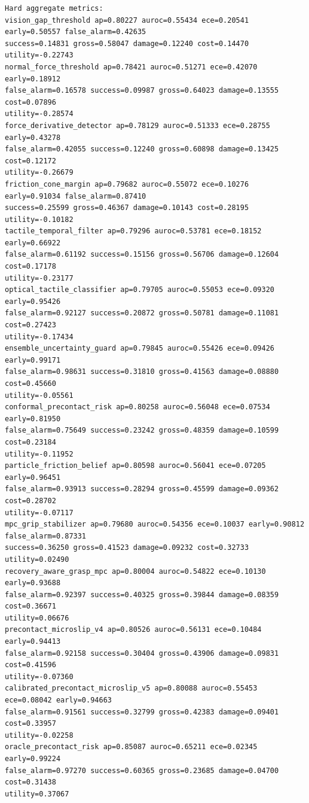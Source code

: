 \documentclass{article}
\begin{document}
\begin{tiny}
\begin{verbatim}
Hard aggregate metrics:
vision_gap_threshold ap=0.80227 auroc=0.55434 ece=0.20541 early=0.50557 false_alarm=0.42635
success=0.14831 gross=0.58047 damage=0.12240 cost=0.14470 utility=-0.22743
normal_force_threshold ap=0.78421 auroc=0.51271 ece=0.42070 early=0.18912
false_alarm=0.16578 success=0.09987 gross=0.64023 damage=0.13555 cost=0.07896
utility=-0.28574
force_derivative_detector ap=0.78129 auroc=0.51333 ece=0.28755 early=0.43278
false_alarm=0.42055 success=0.12240 gross=0.60898 damage=0.13425 cost=0.12172
utility=-0.26679
friction_cone_margin ap=0.79682 auroc=0.55072 ece=0.10276 early=0.91034 false_alarm=0.87410
success=0.25599 gross=0.46367 damage=0.10143 cost=0.28195 utility=-0.10182
tactile_temporal_filter ap=0.79296 auroc=0.53781 ece=0.18152 early=0.66922
false_alarm=0.61192 success=0.15156 gross=0.56706 damage=0.12604 cost=0.17178
utility=-0.23177
optical_tactile_classifier ap=0.79705 auroc=0.55053 ece=0.09320 early=0.95426
false_alarm=0.92127 success=0.20872 gross=0.50781 damage=0.11081 cost=0.27423
utility=-0.17434
ensemble_uncertainty_guard ap=0.79845 auroc=0.55426 ece=0.09426 early=0.99171
false_alarm=0.98631 success=0.31810 gross=0.41563 damage=0.08880 cost=0.45660
utility=-0.05561
conformal_precontact_risk ap=0.80258 auroc=0.56048 ece=0.07534 early=0.81950
false_alarm=0.75649 success=0.23242 gross=0.48359 damage=0.10599 cost=0.23184
utility=-0.11952
particle_friction_belief ap=0.80598 auroc=0.56041 ece=0.07205 early=0.96451
false_alarm=0.93913 success=0.28294 gross=0.45599 damage=0.09362 cost=0.28702
utility=-0.07117
mpc_grip_stabilizer ap=0.79680 auroc=0.54356 ece=0.10037 early=0.90812 false_alarm=0.87331
success=0.36250 gross=0.41523 damage=0.09232 cost=0.32733 utility=0.02490
recovery_aware_grasp_mpc ap=0.80004 auroc=0.54822 ece=0.10130 early=0.93688
false_alarm=0.92397 success=0.40325 gross=0.39844 damage=0.08359 cost=0.36671
utility=0.06676
precontact_microslip_v4 ap=0.80526 auroc=0.56131 ece=0.10484 early=0.94413
false_alarm=0.92158 success=0.30404 gross=0.43906 damage=0.09831 cost=0.41596
utility=-0.07360
calibrated_precontact_microslip_v5 ap=0.80088 auroc=0.55453 ece=0.08042 early=0.94663
false_alarm=0.91561 success=0.32799 gross=0.42383 damage=0.09401 cost=0.33957
utility=-0.02258
oracle_precontact_risk ap=0.85087 auroc=0.65211 ece=0.02345 early=0.99224
false_alarm=0.97270 success=0.60365 gross=0.23685 damage=0.04700 cost=0.31438
utility=0.37067


\end{verbatim}
\end{tiny}
\end{document}
